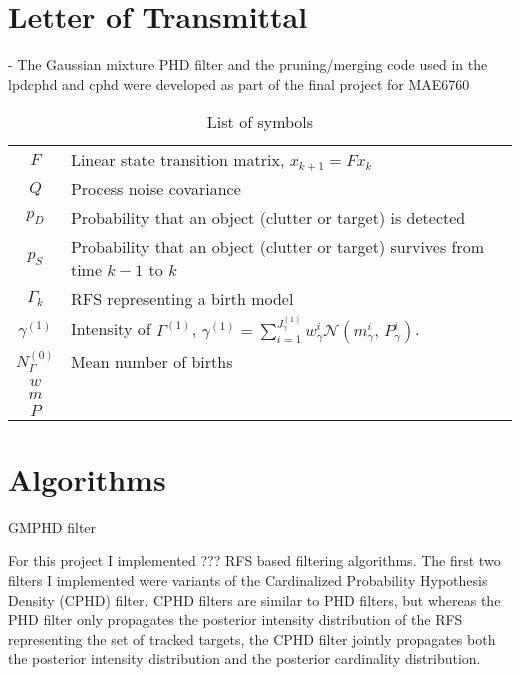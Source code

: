 \documentclass{article}
\begin{document}
\section*{Letter of Transmittal}
- The Gaussian mixture PHD filter and the pruning/merging code used in the lpdcphd and cphd were
developed as part of the final project for MAE6760


\begin{table}[h]
  \begin{center}
    \begin{tabular}{ c l } 
      $F$ & Linear state transition matrix, $x_{k+1} = Fx_k$ \\
      $Q$ & Process noise covariance \\
      $p_{D}$ & Probability that an object (clutter or target) is detected\\
      $p_{S}$ & Probability that an object (clutter or target) survives from time $k-1$ to $k$\\
      $\Gamma_k$ & RFS representing a birth model\\
      $\gamma^{(1)}$ & Intensity of $\Gamma^{(1)}$, $\gamma^{(1)} = \sum_{i=1}^{J_{\gamma}^{(1)}}w_{\gamma}^i \mathcal{N}(m_{\gamma}^i,\,P_{\gamma}^i)$.\\
      $N_{\Gamma}^{(0)}$ & Mean number of births \\
      $w$ & \\
      $m$ & \\
      $P$ & \\
    \end{tabular}
  \end{center}
  \caption{\label{tab:variables}List of symbols}
\end{table}


\section*{Algorithms}
GMPHD filter\cite{gmphd}

For this project I implemented ??? RFS based filtering algorithms. The first two filters I implemented were variants of the Cardinalized Probability Hypothesis Density (CPHD) filter. CPHD filters are similar to PHD filters, but whereas the PHD filter only propagates the posterior intensity distribution of the RFS representing the set of tracked targets, the CPHD filter jointly propagates both the posterior intensity distribution and the posterior cardinality distribution.
\end{document}
